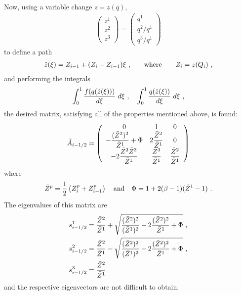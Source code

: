 Now, using a variable change $z=z(q)$,
\begin{align*}
  \left(
  \begin{array}{c}
    z^1 \\
    z^2 \\
    z^3
  \end{array}
  \right)
  =
  \left(
    \begin{array}{c}
      q^1 \\
      q^2 / q^1 \\
      q^3 / q^1
    \end{array}
  \right)
\end{align*}
to define a path 
\begin{align*}
  \hat{z}(\xi) = Z_{i-1} + (Z_i - Z_{i-1}) \xi \ \text{,}
  \qquad
  \text{where}
  \qquad
  Z_i=z(Q_i) \ \text{,}
\end{align*}
and performing the integrals
\begin{align*}
  \int_0^1 \frac{f(q(\hat{z}(\xi)))}{d\xi} \ d\xi
  \ \text{,} \quad
  \int_0^1 \frac{q(\hat{z}(\xi))}{d\xi} \ d\xi
  \ \text{,}
\end{align*}
the desired matrix, satisfying all of the properties mentioned above, is found: %
{\renewcommand{\arraystretch}{2.5}
\begin{align*}
  \hat{A}_{i-1/2}
  =
  \left(
    \begin{array}{ccc}
      0 & 1 & 0 \\
      -\dfrac{(\bar{Z}^{2})^2}{\bar{Z}^{1}} + \Phi
      & 2\dfrac{\bar{Z}^{2}}{\bar{Z}^{1}} & 0  \\
      -2\dfrac{\bar{Z}^{2}\bar{Z}^{3}}{\bar{Z}^{1}} & \dfrac{\bar{Z}^{3}}{\bar{Z}^{1}}
      & \dfrac{\bar{Z}^{2}}{\bar{Z}^{1}}
    \end{array}
  \right)
\end{align*}}
where
\begin{align*}
  \bar{Z}^{p} = \frac{1}{2}\left(Z^p_{i} + Z^p_{i-1}\right) 
  \quad \text{and} \quad
  \Phi = 1 + 2(\beta-1)(\bar{Z}^{1}-1) \ \text{.}
\end{align*}
The eigenvalues of this matrix are
\begin{align}
  \label{eq:lambda1}
  s_{i-1/2}^1 &= \frac{\bar{Z}^{2}}{\bar{Z}^{1}}
  + \sqrt{\frac{(\bar{Z}^{2})^2}{(\bar{Z}^{1})^2}
    - 2 \frac{(\bar{Z}^{2})^2}{\bar{Z}^{1}} 
    + \Phi
  } \ \text{,}\\   
  \label{eq:lambda2}
  s_{i-1/2}^2 &= \frac{\bar{Z}^{2}}{\bar{Z}^{1}}
  - \sqrt{\frac{(\bar{Z}^{2})^2}{(\bar{Z}^{1})^2}
    - 2 \frac{(\bar{Z}^{2})^2}{\bar{Z}^{1}} 
    + \Phi
  } \ \text{,}\\   
  s_{i-1/2}^3 &= \frac{\bar{Z}^{2}}{\bar{Z}^{1}}
\end{align}
and the respective eigenvectors are not difficult to obtain.  

